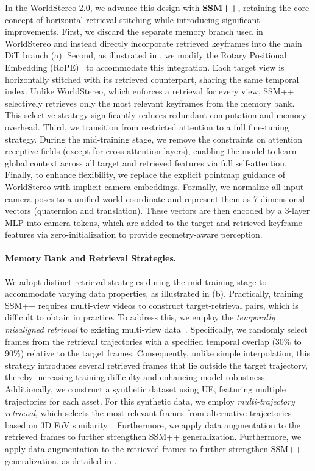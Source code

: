 \documentclass{article} %
\begin{document}
In the WorldStereo 2.0, we advance this design with \textbf{SSM++}, retaining the core concept of horizontal retrieval stitching while introducing significant improvements.
First, we discard the separate memory branch used in WorldStereo and instead directly incorporate retrieved keyframes into the main DiT branch (a).
Second, as illustrated in , we modify the Rotary Positional Embedding (RoPE)~\cite{su2024roformer} to accommodate this integration.
Each target view is horizontally stitched with its retrieved counterpart, sharing the same temporal index. Unlike WorldStereo, which enforces a retrieval for every view, SSM++ selectively retrieves only the most relevant keyframes from the memory bank. This selective strategy significantly reduces redundant computation and memory overhead. 
Third, we transition from restricted attention to a full fine-tuning strategy. During the mid-training stage, we remove the constraints on attention receptive fields (except for cross-attention layers), enabling the model to learn global context across all target and retrieved features via full self-attention.
Finally, to enhance flexibility, we replace the explicit pointmap guidance of WorldStereo with implicit camera embeddings. Formally, we normalize all input camera poses to a unified world coordinate and represent them as 7-dimensional vectors (quaternion and translation). These vectors are then encoded by a 3-layer MLP into camera tokens, which are added to the target and retrieved keyframe features via zero-initialization to provide geometry-aware perception.

\paragraph{Memory Bank and Retrieval Strategies.}
We adopt distinct retrieval strategies during the mid-training stage to accommodate varying data properties, as illustrated in (b).
Practically, training SSM++ requires multi-view videos to construct target-retrieval pairs, which is difficult to obtain in practice. 
To address this, we employ the \emph{temporally misaligned retrieval} to existing multi-view data~\cite {ling2024dl3dv,xia2024rgbd,tartanair2020iros,arnold2022map}.
Specifically, we randomly select frames from the retrieval trajectories with a specified temporal overlap (30\% to 90\%) relative to the target frames. Consequently, unlike simple interpolation, this strategy introduces several retrieved frames that lie outside the target trajectory, thereby increasing training difficulty and enhancing model robustness.
Additionally, we construct a synthetic dataset using UE, featuring multiple trajectories for each asset. For this synthetic data, we employ \emph{multi-trajectory retrieval}, which selects the most relevant frames from alternative trajectories based on 3D FoV similarity~\cite{worldstereo2026}. Furthermore, we apply data augmentation to the retrieved frames to further strengthen SSM++ generalization.
Furthermore, we apply data augmentation to the retrieved frames to further strengthen SSM++ generalization, as detailed in .
\end{document}
